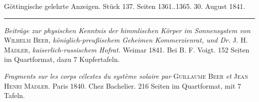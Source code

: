 \clearpage
{}
\hypertarget{native-657-lower}{}
\begin{center}\small Göttingische gelehrte Anzeigen. Stück 137. Seiten 1361..1365. 30. August 1841.\\[3pt]\rule{.72\linewidth}{.3pt}\end{center}

\emph{Beiträge zur physischen Kenntnis der himmlischen Körper im Sonnensystem von} \textsc{Wilhelm Beer}, \emph{königlich-preußischem Geheimen Kommerzienrat, und Dr.} J. H. \textsc{Mädler}, \emph{kaiserlich-russischem Hofrat.} Weimar 1841. Bei B. F. Voigt. 152 Seiten im Quartformat, dazu 7 Kupfertafeln.

\emph{Fragments sur les corps célestes du système solaire par} \textsc{Guillaume Beer} \emph{et} \textsc{Jean Henri Mädler.} Paris 1840. Chez Bachelier. 216 Seiten im Quartformat, mit 7 Tafeln.

